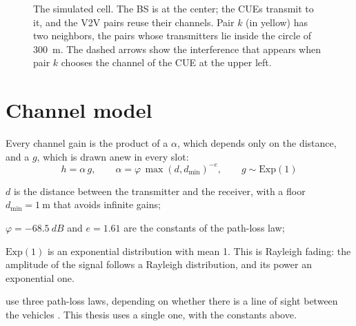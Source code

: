 \begin{figure}[tbp]
  \caption[The simulated cell]{The simulated cell. The \acs{BS} is at the center; the \acsp{CUE} transmit
    to it, and the \acs{V2V} pairs reuse their channels. Pair $k$ (in yellow) has two neighbors, the pairs
    whose transmitters lie inside the circle of \SI{300}{\meter}. The dashed arrows show the interference
    that appears when pair $k$ chooses the channel of the \acs{CUE} at the upper left.}
  \label{fig:sm-scenario}
\end{figure}

\section{Channel model}
\label{sec:sm-channel}

Every channel gain is the product of a  $\alpha$, which depends only on the
distance, and a  $g$, which is drawn anew in every slot:
\begin{equation}
  h = \alpha\, g, \qquad \alpha = \varphi\, \max(d, d_{\mathrm{min}})^{-e}, \qquad g \sim \mathrm{Exp}(1)
  \label{eq:sm-channel}
\end{equation}
\begin{wherelist}
  \item $d$ is the distance between the transmitter and the receiver, with a floor
    $d_{\mathrm{min}} = \SI{1}{\meter}$ that avoids infinite gains;
  \item $\varphi = \SI{-68.5}{dB}$ and $e = 1.61$ are the constants of the path-loss law;
  \item $\mathrm{Exp}(1)$ is an exponential distribution with mean 1. This is Rayleigh fading: the
    amplitude of the signal follows a Rayleigh distribution, and its power an exponential one.
\end{wherelist}
\citet{li+22fedmarl} use three path-loss laws, depending on whether there is a line of sight between the
vehicles \cite[Eq.~4]{li+22fedmarl}. This thesis uses a single one, with the constants above.

